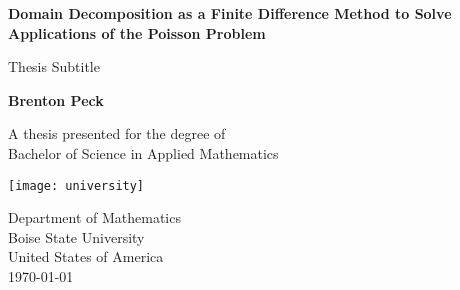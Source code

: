 \begin{titlepage}
    \begin{center}
        \vspace*{1cm}
        
	\Huge
        \textbf{Domain Decomposition as a Finite Difference Method to Solve Applications of the Poisson Problem}
        
        \vspace{0.5cm}
	\LARGE
        Thesis Subtitle
        
        \vspace{1.5cm}
        
        \textbf{Brenton Peck}
        
        \vfill
        
        A thesis presented for the degree of\\
        Bachelor of Science in Applied Mathematics
        
        \vspace{0.8cm}
        
        \texttt{[image: university]}
        
	\Large
        Department of Mathematics\\
        Boise State University\\
        United States of America\\
        \today
        
    \end{center}
\end{titlepage}